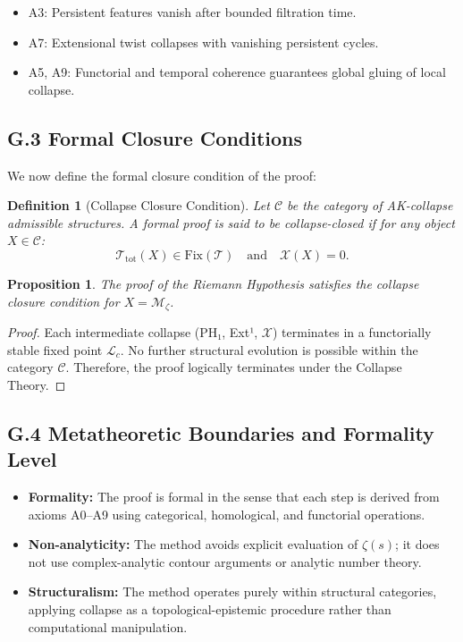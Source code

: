 \documentclass[11pt]{article}
\newtheorem{definition}[theorem]{Definition}
\newtheorem{proposition}[theorem]{Proposition}
\newcommand{\Sha}{\mathcal{X}}
\begin{document}
\begin{itemize}
    \item A3: Persistent features vanish after bounded filtration time.
    \item A7: Extensional twist collapses with vanishing persistent cycles.
    \item A5, A9: Functorial and temporal coherence guarantees global gluing of local collapse.
\end{itemize}

\subsection*{G.3 Formal Closure Conditions}

We now define the formal closure condition of the proof:

\begin{definition}[Collapse Closure Condition]
Let $\mathcal{C}$ be the category of AK-collapse admissible structures.  
A formal proof is said to be \emph{collapse-closed} if for any object $X \in \mathcal{C}$:
\[
\mathcal{T}_{\mathrm{tot}}(X) \in \text{Fix}(\mathcal{T}) \quad \text{and} \quad \Sha(X) = 0.
\]
\end{definition}

\begin{proposition}
The proof of the Riemann Hypothesis satisfies the collapse closure condition for $X = \mathcal{M}_\zeta$.
\end{proposition}

\begin{proof}
Each intermediate collapse (PH₁, Ext¹, $\Sha$) terminates in a functorially stable fixed point $\mathcal{L}_c$.  
No further structural evolution is possible within the category $\mathcal{C}$.  
Therefore, the proof logically terminates under the Collapse Theory.
\end{proof}

\subsection*{G.4 Metatheoretic Boundaries and Formality Level}

\begin{itemize}
    \item \textbf{Formality:} The proof is formal in the sense that each step is derived from axioms A0–A9  
    using categorical, homological, and functorial operations.
    \item \textbf{Non-analyticity:} The method avoids explicit evaluation of $\zeta(s)$;  
    it does not use complex-analytic contour arguments or analytic number theory.
    \item \textbf{Structuralism:} The method operates purely within structural categories,  
    applying collapse as a topological-epistemic procedure rather than computational manipulation.
\end{itemize}
\end{document}

